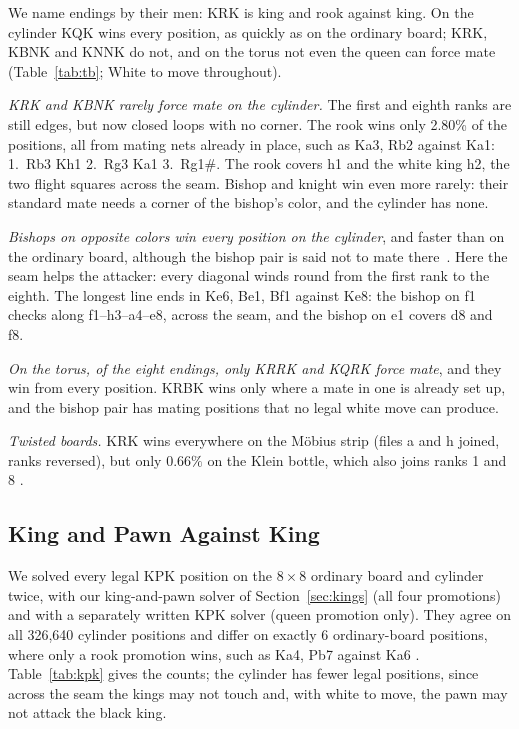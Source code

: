 We name endings by their men: KRK is king and rook against king. On the cylinder KQK wins every position, as quickly as on the ordinary board; KRK, KBNK and KNNK do not, and
on the torus not even the queen can force mate (Table~\ref{tab:tb}; White to move throughout).

\emph{KRK and KBNK rarely force mate on the cylinder.} The first and eighth ranks are still edges, but now
closed loops with no corner. The rook wins only 2.80\% of the positions, all from mating nets already
in place, such as Ka3, Rb2 against Ka1: 1.~Rb3 Kh1 2.~Rg3 Ka1 3.~Rg1\#. The rook covers h1 and the
white king h2, the two flight squares across the seam. Bishop and knight win even more rarely: their standard mate
needs a corner of the bishop's color, and the cylinder has none.

\emph{Bishops on opposite colors win every position on the cylinder}, and faster than on the ordinary board,
although the bishop pair is said not to mate there~\cite{HGMCylinder}.
Here the seam helps the attacker: every diagonal winds round from the first rank to the eighth. The longest
line ends in Ke6, Be1, Bf1 against Ke8: the bishop on f1 checks along f1--h3--a4--e8, across the seam, and
the bishop on e1 covers d8 and f8.

\emph{On the torus, of the eight endings, only KRRK and KQRK force mate}, and they win from every position. KRBK wins only where
a mate in one is already set up, and the bishop pair has mating positions that no legal white move can
produce.

\emph{Twisted boards.} KRK wins everywhere on the M\"obius strip (files a and h joined, ranks reversed), but
only $0.66\%$ on the Klein bottle, which also joins ranks 1 and 8 .

\subsection{King and Pawn Against King}\label{sec:kpk}

We solved every legal KPK position on the $8\times8$ ordinary board and cylinder twice, with our
king-and-pawn solver of Section~\ref{sec:kings} (all four promotions) and with a separately written KPK
solver (queen promotion only). They agree on all 326,640 cylinder positions and differ on exactly 6
ordinary-board positions, where only a rook promotion wins, such as Ka4, Pb7 against
Ka6 . Table~\ref{tab:kpk} gives the counts; the cylinder has fewer legal positions, since across the seam
the kings may not touch and, with white to move, the pawn may not attack the black king.

